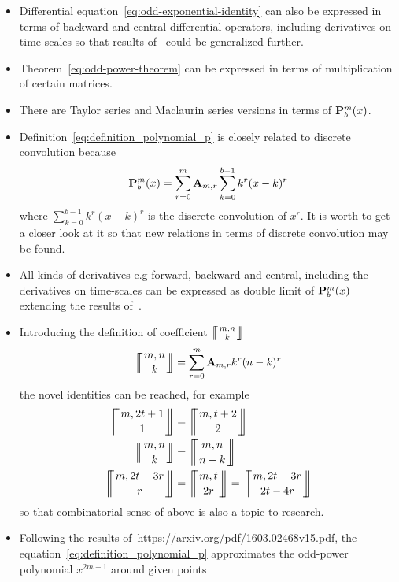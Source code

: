 \begin{itemize}
    \item Differential equation~\eqref{eq:odd-exponential-identity} can also be expressed in terms of backward
    and central differential operators, including derivatives on time-scales so that results of~\cite{kolosov2016study}
    could be generalized further.
    \item Theorem~\eqref{eq:odd-power-theorem} can be expressed in terms of multiplication of certain matrices.
    \item There are Taylor series and Maclaurin series versions in terms of ${\mathbf{P}}\sp{m} \sb{b}(x)$.
    \item Definition~\eqref{eq:definition_polynomial_p} is closely related to discrete convolution because
    \begin{equation*}
        {\mathbf{P}}\sp{m} \sb{b}(x) = \sum_{r=0}^{m} {\mathbf{A}} \sb{m,r} \sum_{k=0}^{b-1} k^r(x-k)^r
    \end{equation*}
    where $\sum_{k=0}^{b-1} k^r(x-k)^r$ is the discrete convolution of $x^r$.
    It is worth to get a closer look at it so that new relations in terms of discrete convolution may be found.
    \item All kinds of derivatives e.g forward, backward and central, including the derivatives on time-scales can be expressed
    as double limit of ${\mathbf{P}}\sp{m} \sb{b}(x)$ extending the results of~\cite{kolosov_2024_10575485}.
    \item Introducing the definition of coefficient $\llceilCoefficient{m,n}{k}$
    \begin{equation*}
        \llceilCoefficient{m,n}{k} = \sum_{r=0}^{m} \coeffA{m}{r} k^r (n-k)^r
    \end{equation*}
    the novel identities can be reached, for example
    \begin{align*}
        \llceilCoefficient{m, 2t+1}{1} &= \llceilCoefficient{m, t+2}{2} \\
        \llceilCoefficient{m, n}{k} &= \llceilCoefficient{m, n}{n-k} \\
        \llceilCoefficient{m, 2t-3r}{r} &= \llceilCoefficient{m, t}{2r} = \llceilCoefficient{m, 2t-3r}{2t-4r}
    \end{align*}
    so that combinatorial sense of above is also a topic to research.
    \item Following the results of~\url{https://arxiv.org/pdf/1603.02468v15.pdf},
    the equation~\eqref{eq:definition_polynomial_p} approximates the odd-power polynomial $x^{2m+1}$ around given points

\end{itemize}
